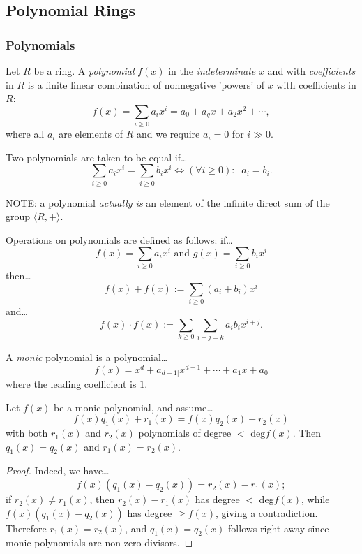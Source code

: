 \subsection{Polynomial Rings}\label{polynomialrings}

\subsubsection{Polynomials}\label{polynomials}
Let $R$ be a ring. A \emph{polynomial} $f(x)$ in the \emph{indeterminate} $x$ and with \emph{coefficients} in $R$
is a finite linear combination of nonnegative 'powers' of $x$ with coefficients in $R$:
$$f(x) = \sum_{i \geq 0} a_i x^i = a_0 + a_qx+a_2x^2 + \cdots,$$
where all $a_i$ are elements of $R$ and we require $a_i = 0$ for $i \gg 0.$\newline

\noindent Two polynomials are taken to be equal if\dots
$$\sum_{i \geq 0} a_i x^i = \sum_{i \geq 0} b_i x^i \Leftrightarrow (\forall i \geq 0): \; \; a_i = b_i.$$

\noindent NOTE: a polynomial \emph{actually is} an element of the infinite direct sum of the group $\langle R,+ \rangle$.\newline

Operations on polynomials are defined as follows: if\dots
$$f(x) = \sum_{i \geq 0} a_i x^i \textrm{ and } g(x) = \sum_{i \geq 0} b_i x^i$$
then\dots
$$f(x) + f(x) := \sum_{i \geq 0} (a_i + b_i) x^i$$
and\dots
$$f(x) \cdot f(x) := \sum_{k \geq 0}\sum_{i+j = k} a_ib_ix^{i+j}.$$

A \emph{monic} polynomial is a polynomial\dots
$$f(x) = x^d + a_{d-1]}x^{d-1} + \cdots + a_1x +a_0$$
where the leading coefficient is $1$.

\begin{lemma}
\label{uniquepolynomialdivision}
Let $f(x)$ be a monic polynomial, and assume\dots
$$f(x)q_1(x) + r_1(x) = f(x)q_2(x) + r_2(x)$$
with both $r_1(x)$ and $r_2(x)$ polynomials of degree $<$ deg$f(x)$. Then $q_1(x) = q_2(x)$
and $r_1(x) = r_2(x).$
\end{lemma}

\begin{proof}
Indeed, we have\dots
$$f(x)(q_1(x)-q_2(x))=r_2(x)-r_1(x);$$
if $r_2(x) \neq r_1(x)$, then $r_2(x) - r_1(x)$ has degree $<$ deg$f(x)$, while $f(x)(q_1(x)-q_2(x))$ has degree $\geq f(x)$,
giving a contradiction. Therefore $r_1(x) = r_2(x)$, and $q_1(x) = q_2(x)$ follows right away since monic polynomials are
non-zero-divisors.
\end{proof}

